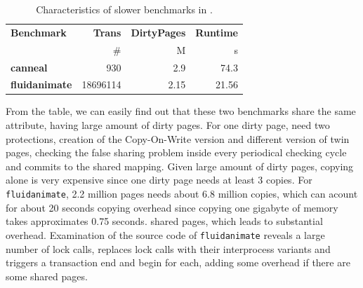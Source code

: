 \begin{table}
\centering
\begin{tabular}{|l|r|r|r|}
\hline
{\bf \small Benchmark} & {\bf \small Trans} &{\bf \small DirtyPages} & {\bf \small Runtime} \\
 & {\#} & {M} & {s}\\
\hline
{\bf \small canneal} & 930 & 2.9 & 74.3 \\
{\bf \small fluidanimate} & 18696114 & 2.15 & 21.56\\
\hline
\end{tabular}
\caption{Characteristics of slower benchmarks in \sheriffdetect{}.
\label{table:characteristics}}
\end{table}

From the table, we can easily find out that these two benchmarks share the same attribute, having large amount of dirty pages. 
For one dirty page, \sheriffdetect{} need two protections, creation of the Copy-On-Write version and
different version of twin pages, checking the false sharing problem inside every periodical checking cycle and 
commits to the shared mapping. Given large amount of dirty pages, copying alone is very expensive 
since one dirty page needs at least 3 copies. 
For \texttt{fluidanimate}, 2.2 million pages needs about 6.8 million copies, which can 
acount for about 20 seconds copying overhead since copying one gigabyte of memory takes approximates 0.75 seconds.
shared pages, which leads to substantial overhead.
Examination of the source code of \texttt{fluidanimate} reveals a large number of lock
calls, \sheriff{} replaces lock calls with their interprocess variants
and triggers a transaction end and begin for each, adding some overhead if there are some shared pages.
 
